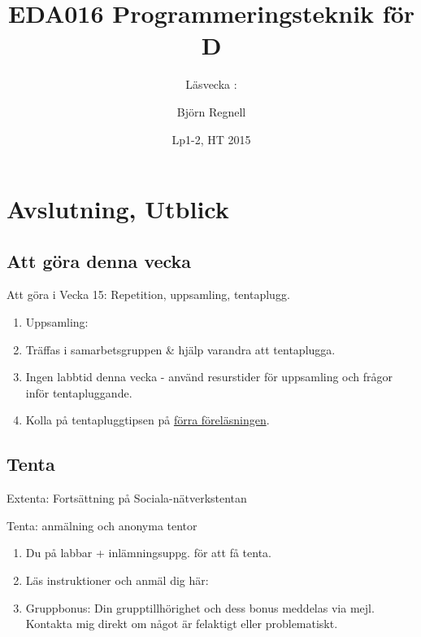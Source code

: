 \documentclass{lecturenotes}
\title[Föreläsningsanteckningar EDA016, 2015]{EDA016 Programmeringsteknik för D}
\subtitle{Läsvecka \vecka: \tema}
\author{Björn Regnell}
\institute{Datavetenskap, LTH}
\date{Lp1-2, HT 2015}
\renewcommand{\vecka}{15}
\newcommand{\tema}{Avslutning, Utblick}
\begin{document}
\frame{\titlepage}
\setnextsection{\vecka}
\section[Vecka \vecka: \tema]{\tema}
\frame{\tableofcontents}

\subsection{Att göra denna vecka}
\begin{Slide}{Att göra i Vecka \vecka: Repetition, uppsamling, tentaplugg.}
\begin{enumerate}
\item Uppsamling: 
\item Träffas i samarbetsgruppen \& hjälp varandra att tentaplugga.
\item Ingen labbtid denna vecka - använd resurstider för uppsamling och frågor inför tentapluggande.
\item Kolla på tentapluggtipsen på \href{https://github.com/bjornregnell/lth-eda016-2015/blob/master/lectures/notes/week14.pdf}{förra föreläsningen}.
\end{enumerate}
\end{Slide}

\subsection{Tenta}

\begin{Slide}{Extenta: Fortsättning på Sociala-nätverkstentan}
\end{Slide}

\begin{Slide}{Tenta: anmälning och anonyma tentor}
\begin{enumerate}
\item Du  på  labbar + inlämningsuppg. för att få tenta.
\item Läs instruktioner och anmäl dig här:
\item Gruppbonus: Din grupptillhörighet och dess bonus meddelas via mejl. Kontakta mig direkt om något är felaktigt eller problematiskt. 
\end{enumerate}
\end{Slide}
\end{document}
